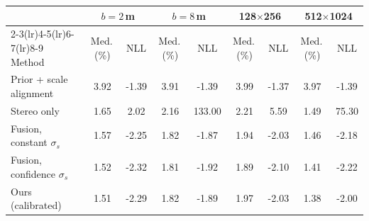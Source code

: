 \begin{tabular}{l cccccccc}
\toprule
 & \multicolumn{2}{c}{$b{=}2$\,m} & \multicolumn{2}{c}{$b{=}8$\,m} & \multicolumn{2}{c}{128$\times$256} & \multicolumn{2}{c}{512$\times$1024} \\
\cmidrule(lr){2-3}\cmidrule(lr){4-5}\cmidrule(lr){6-7}\cmidrule(lr){8-9}
Method & Med.\,(\%) & NLL & Med.\,(\%) & NLL & Med.\,(\%) & NLL & Med.\,(\%) & NLL \\
\midrule
Prior + scale alignment & 3.92 & -1.39 & 3.91 & -1.39 & 3.99 & -1.37 & 3.97 & -1.39 \\
Stereo only & 1.65 & 2.02 & 2.16 & 133.00 & 2.21 & 5.59 & 1.49 & 75.30 \\
Fusion, constant $\sigma_s$ & 1.57 & -2.25 & 1.82 & -1.87 & 1.94 & -2.03 & 1.46 & -2.18 \\
Fusion, confidence $\sigma_s$ & 1.52 & -2.32 & 1.81 & -1.92 & 1.89 & -2.10 & 1.41 & -2.22 \\
Ours (calibrated) & 1.51 & -2.29 & 1.82 & -1.89 & 1.97 & -2.03 & 1.38 & -2.00 \\
\bottomrule
\end{tabular}